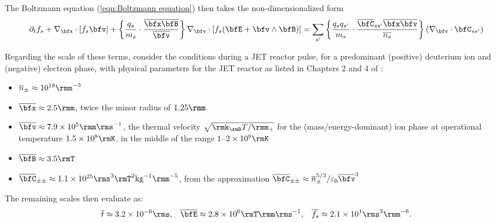     The Boltzmann equation (\ref{eqn:Boltzmann equation}) then takes the non-dimensionalized form
    \begin{equation}
        \partial_{t}f_{s} + \nabla_{\bfx}\cdot[f_{s}\bfv] + \left\{\frac{q_{s}}{m_{s}}\cdot\frac{\overline{\bfx}\overline{\bfB}}{\overline{\bfv}}\right\}\nabla_{\bfv}\cdot[f_{s}(\bfE + \bfv\wedge\bfB)]  =  \sum_{s'}\left\{\frac{q_{s}q_{s'}}{m_{s}}\cdot\frac{\overline{\bfC}_{ss'}\overline{\bfx}\overline{\bfv}}{\overline{n_{s}}}\right\}(\nabla_{\bfv}\cdot\bfC_{ss'})
    \end{equation}
    
    Regarding the scale of these terms, consider the conditions during a JET reactor pulse, for a predominant (positive) deuterium  ion and (negative) electron phase, with physical parameters for the JET reactor as listed in Chapters 2 and 4 of \cite{Wes00}:
    \begin{itemize}
        \item  $\overline{n}_{\pm}        \approx  10^{19}\rmm^{- 3}$
        \item  $\overline{\bfx}           \approx  2.5\rmm$, twice the minor radius of $1.25\rmm$
        \item  $\overline{\bfv}           \approx  7.9\times 10^{5}\rmm\rms^{- 1}$, the thermal velocity $\sqrt{\rmk_{\rmB}T/\rmm_{+}}$ for the (mass/energy-dominant) ion phase at operational temperature $1.5\times 10^{8}\rmK$, in the middle of the range $1$–$2\times 10^{8}\rmK$
        \item  $\overline{\bfB}           \approx  3.5\rmT$
        \item  $\overline{\bfC}_{\pm\pm}  \approx  1.1\times 10^{25}\rms^{3}\rmT^{2}{\rm kg}^{- 1}\rmm^{- 5}$, from the approximation $\overline{\bfC}_{\pm\pm}  \approx  \overline{n}_{\pm}^{5/3}/\varepsilon_{0}\overline{\bfv}^{3}$ 
    \end{itemize}
    The remaining scales then evaluate as:
    \begin{align}
        \overline{t}      \approx  3.2\times 10^{- 6}\rms,              &&
        \overline{\bfE}   \approx  2.8\times 10^{6}\rmT\rmm\rms^{- 1},  &&
        \overline{f_{s}}  \approx  2.1\times 10^{1}\rms^{3}\rmm^{- 6}.
    \end{align}
    
    
